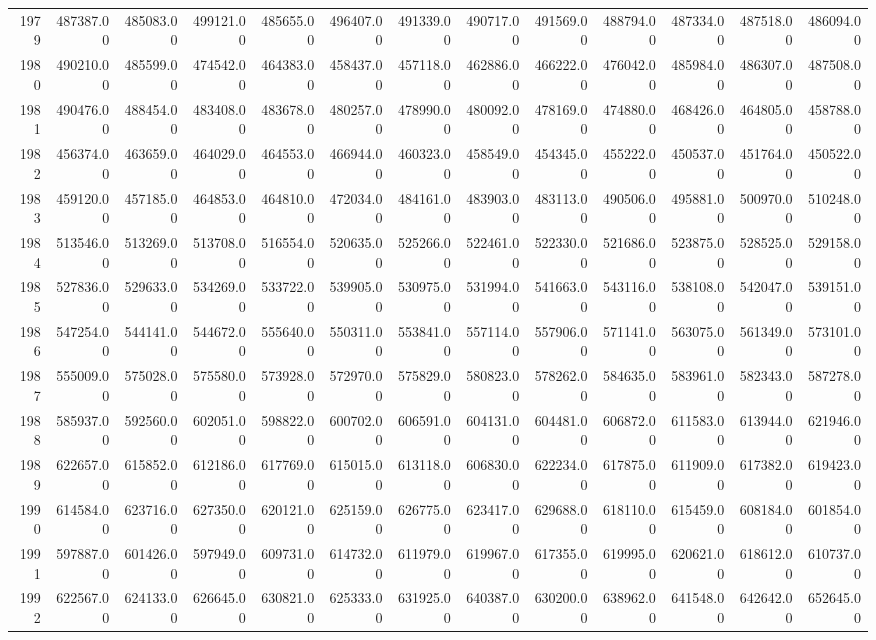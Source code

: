 \begin{longtable}{rrrrrrrrrrrrr}
  1979 & 487387.00 & 485083.00 & 499121.00 & 485655.00 & 496407.00 & 491339.00 & 490717.00 & 491569.00 & 488794.00 & 487334.00 & 487518.00 & 486094.00 \\ 
  1980 & 490210.00 & 485599.00 & 474542.00 & 464383.00 & 458437.00 & 457118.00 & 462886.00 & 466222.00 & 476042.00 & 485984.00 & 486307.00 & 487508.00 \\ 
  1981 & 490476.00 & 488454.00 & 483408.00 & 483678.00 & 480257.00 & 478990.00 & 480092.00 & 478169.00 & 474880.00 & 468426.00 & 464805.00 & 458788.00 \\ 
  1982 & 456374.00 & 463659.00 & 464029.00 & 464553.00 & 466944.00 & 460323.00 & 458549.00 & 454345.00 & 455222.00 & 450537.00 & 451764.00 & 450522.00 \\ 
  1983 & 459120.00 & 457185.00 & 464853.00 & 464810.00 & 472034.00 & 484161.00 & 483903.00 & 483113.00 & 490506.00 & 495881.00 & 500970.00 & 510248.00 \\ 
  1984 & 513546.00 & 513269.00 & 513708.00 & 516554.00 & 520635.00 & 525266.00 & 522461.00 & 522330.00 & 521686.00 & 523875.00 & 528525.00 & 529158.00 \\ 
  1985 & 527836.00 & 529633.00 & 534269.00 & 533722.00 & 539905.00 & 530975.00 & 531994.00 & 541663.00 & 543116.00 & 538108.00 & 542047.00 & 539151.00 \\ 
  1986 & 547254.00 & 544141.00 & 544672.00 & 555640.00 & 550311.00 & 553841.00 & 557114.00 & 557906.00 & 571141.00 & 563075.00 & 561349.00 & 573101.00 \\ 
  1987 & 555009.00 & 575028.00 & 575580.00 & 573928.00 & 572970.00 & 575829.00 & 580823.00 & 578262.00 & 584635.00 & 583961.00 & 582343.00 & 587278.00 \\ 
  1988 & 585937.00 & 592560.00 & 602051.00 & 598822.00 & 600702.00 & 606591.00 & 604131.00 & 604481.00 & 606872.00 & 611583.00 & 613944.00 & 621946.00 \\ 
  1989 & 622657.00 & 615852.00 & 612186.00 & 617769.00 & 615015.00 & 613118.00 & 606830.00 & 622234.00 & 617875.00 & 611909.00 & 617382.00 & 619423.00 \\ 
  1990 & 614584.00 & 623716.00 & 627350.00 & 620121.00 & 625159.00 & 626775.00 & 623417.00 & 629688.00 & 618110.00 & 615459.00 & 608184.00 & 601854.00 \\ 
  1991 & 597887.00 & 601426.00 & 597949.00 & 609731.00 & 614732.00 & 611979.00 & 619967.00 & 617355.00 & 619995.00 & 620621.00 & 618612.00 & 610737.00 \\ 
  1992 & 622567.00 & 624133.00 & 626645.00 & 630821.00 & 625333.00 & 631925.00 & 640387.00 & 630200.00 & 638962.00 & 641548.00 & 642642.00 & 652645.00 \\ 

\end{longtable}
